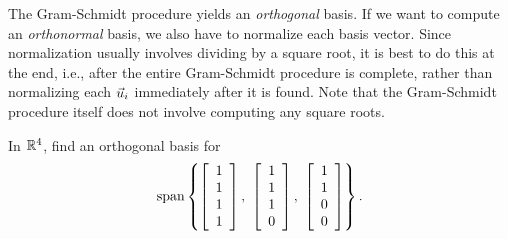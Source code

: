 \documentclass{ximera}
\begin{document}
The Gram-Schmidt procedure yields an {\em orthogonal} basis. If we
want to compute an {\em orthonormal} basis, we also have to normalize
each basis vector. Since normalization usually involves dividing by a
square root, it is best to do this at the end, i.e., after the entire
Gram-Schmidt procedure is complete, rather than normalizing each
$\vect{u}_i$ immediately after it is found. Note that the Gram-Schmidt
procedure itself does not involve computing any square roots.

\begin{example}\label{ex:finding-orthonormal-basis-r4}
  In $\R^4$, find an orthogonal basis for
  \begin{equation*}
    \sspan\set{
      \startmat{c} 1 \\ 1 \\ 1 \\ 1 \stopmat,~
      \startmat{c} 1 \\ 1 \\ 1 \\ 0 \stopmat,~
      \startmat{c} 1 \\ 1 \\ 0 \\ 0 \stopmat
    }.
  \end{equation*}
\end{example}
\end{document}
